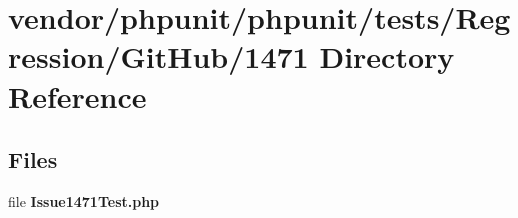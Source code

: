\section{vendor/phpunit/phpunit/tests/\+Regression/\+Git\+Hub/1471 Directory Reference}
\label{dir_e99315f81631abab2f7e8c6c6198eba0}
\subsection*{Files}
\begin{DoxyCompactItemize}
\item 
file {\bf Issue1471\+Test.\+php}
\end{DoxyCompactItemize}
